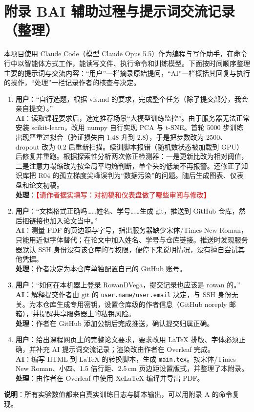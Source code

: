 \section*{附录 B\quad AI 辅助过程与提示词交流记录（整理）}

\noindent 本项目使用 Claude Code（模型 Claude Opus 5.5）作为编程与写作助手，在命令行中以智能体方式工作，能读写文件、执行命令和训练模型。下面按时间顺序整理主要的提示词与交流内容：“用户”一栏摘录原始提问，“AI”一栏概括其回复与执行的操作，“处理”一栏记录作者的核查与决定。

\begin{enumerate}[label=\textbf{轮次 \arabic*}, leftmargin=0pt, itemindent=4.2em, itemsep=6pt]
\item \textbf{用户}：“自行选题，根据 vis.md 的要求，完成整个任务（除了提交部分，我会亲自提交）。”\\
\textbf{AI}：读取课程要求后，选定推荐场景“大模型训练监控”。由于服务器无法正常安装 scikit-learn，改用 numpy 自行实现 PCA 与 t-SNE。首轮 5000 步训练出现严重过拟合（验证损失由 1.48 升到 2.8），于是把步数改为 2500、dropout 改为 0.2 后重新扫描。续训脚本报错（随机数状态被加载到 GPU）后修复并重跑。根据探索性分析两次修正检测器：一是更新比改为相对阈值，二是注意力塌缩改为按全局平均熵判断，单个头的低熵不再报警。还修正了知识库把 R04 的孤立梯度尖峰误判为“数据污染”的问题。随后生成图表、仪表盘和论文初稿。\\
\textbf{处理}：\textcolor{red}{【请作者据实填写：对初稿和仪表盘做了哪些审阅与修改】}

\item \textbf{用户}：“文档格式正确吗……姓名、学号……生成 git，推送到 GitHub 仓库，然后把链接也加入论文当中。”\\
\textbf{AI}：测量 PDF 的页边距与字号，指出服务器缺少宋体/Times New Roman，只能用近似字体替代；在论文中加入姓名、学号与仓库链接。推送时发现服务器默认 SSH 身份没有该仓库的写权限，便停下来说明情况，没有擅自尝试其他凭据。\\
\textbf{处理}：作者决定为本仓库单独配置自己的 GitHub 账号。

\item \textbf{用户}：“如何在本机器上登录 RowanDVega，提交记录也应该是 rowan 的。”\\
\textbf{AI}：解释提交作者由 git 的 \texttt{user.name/user.email} 决定，与 SSH 身份无关。为本仓库生成专用密钥，设置仓库级的作者信息（GitHub noreply 邮箱），并提醒共享服务器上的私钥风险。\\
\textbf{处理}：作者在 GitHub 添加公钥后完成推送，确认提交归属正确。

\item \textbf{用户}：给出课程网页上的完整论文要求，要求改用 LaTeX 排版、字体必须正确，并补充 AI 提示词交流记录；渲染改由作者在 Overleaf 完成。\\
\textbf{AI}：编写 HTML 到 LaTeX 的转换脚本，生成 \texttt{main.tex}。按宋体/Times New Roman、小四、1.5 倍行距、2.5\,cm 页边距设置版式，并整理了本附录。\\
\textbf{处理}：由作者在 Overleaf 中使用 XeLaTeX 编译并导出 PDF。
\end{enumerate}

\noindent\textbf{说明}：所有实验数值都来自真实训练日志与脚本输出，可以用附录 A 的命令复现。
